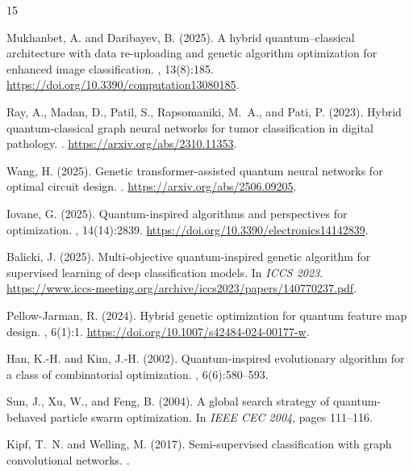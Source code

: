 \documentclass[11pt,a4paper]{article}
\begin{document}

\begin{thebibliography}{15}

Mukhanbet, A. and Daribayev, B. (2025).
\newblock A hybrid quantum--classical architecture with data re-uploading and genetic algorithm optimization for enhanced image classification.
, 13(8):185.
\newblock \url{https://doi.org/10.3390/computation13080185}.

Ray, A., Madan, D., Patil, S., Rapsomaniki, M.~A., and Pati, P. (2023).
\newblock Hybrid quantum-classical graph neural networks for tumor classification in digital pathology.
.
\newblock \url{https://arxiv.org/abs/2310.11353}.

Wang, H. (2025).
\newblock Genetic transformer-assisted quantum neural networks for optimal circuit design.
.
\newblock \url{https://arxiv.org/abs/2506.09205}.

Iovane, G. (2025).
\newblock Quantum-inspired algorithms and perspectives for optimization.
, 14(14):2839.
\newblock \url{https://doi.org/10.3390/electronics14142839}.

Balicki, J. (2025).
\newblock Multi-objective quantum-inspired genetic algorithm for supervised learning of deep classification models.
\newblock In {\em ICCS 2023}.
\newblock \url{https://www.iccs-meeting.org/archive/iccs2023/papers/140770237.pdf}.

Pellow-Jarman, R. (2024).
\newblock Hybrid genetic optimization for quantum feature map design.
, 6(1):1.
\newblock \url{https://doi.org/10.1007/s42484-024-00177-w}.

Han, K.-H. and Kim, J.-H. (2002).
\newblock Quantum-inspired evolutionary algorithm for a class of combinatorial optimization.
, 6(6):580--593.

Sun, J., Xu, W., and Feng, B. (2004).
\newblock A global search strategy of quantum-behaved particle swarm optimization.
\newblock In {\em IEEE CEC 2004}, pages 111--116.

Kipf, T.~N. and Welling, M. (2017).
\newblock Semi-supervised classification with graph convolutional networks.
.


\end{thebibliography}
\end{document}
